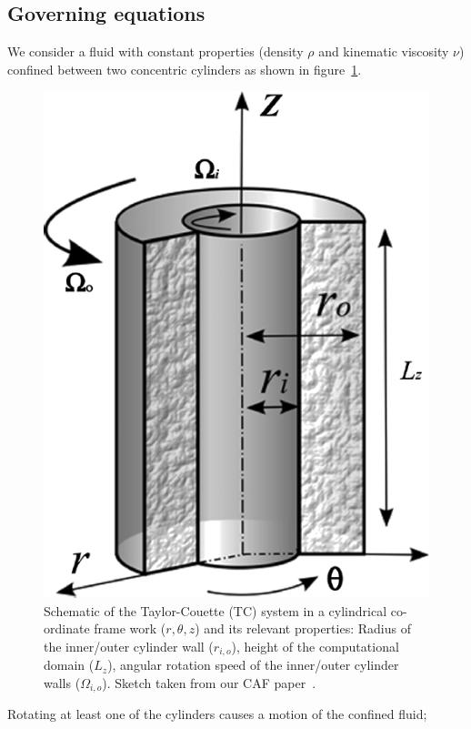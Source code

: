 \documentclass[a4paper, 11pt, DIV=11]{scrartcl}
\begin{document}
\subsection{Governing equations}
We consider a fluid with constant properties (density $\rho$ and kinematic
viscosity $\nu$) confined between two concentric cylinders as shown in
figure~\ref{fig:tc}.
\begin{figure}
\includegraphics[width=1.00\linewidth]{figures/taylorCouette.png}
\caption{Schematic of the Taylor-Couette (TC) system in a cylindrical
co-ordinate frame work ($r, \theta, z$) and its relevant properties:
Radius of the inner/outer cylinder wall ($r_{i,o}$), height of the
computational domain ($L_z$), angular rotation speed of the inner/outer
cylinder walls ($\Omega_{i,o}$). Sketch taken from our CAF paper~\cite{Shi2015}.
}
\label{fig:tc}
\end{figure}
Rotating at least one of the cylinders causes a motion of the confined fluid;
\end{document}
